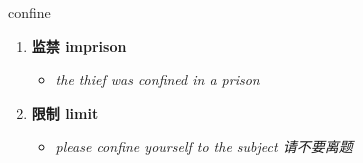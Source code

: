 
\begin{frame}
{\huge confine}
\begin{center}
\begin{enumerate}\Large
  \item \textbf{监禁 imprison}
  \begin{itemize}
    \item \em{\Large{the thief was confined in a prison}}
  \end{itemize}
  \item \textbf{限制 limit}
  \begin{itemize}
    \item \em{\Large{please confine yourself to the subject 请不要离题}}
  \end{itemize}
\end{enumerate}
\end{center}
\end{frame}
